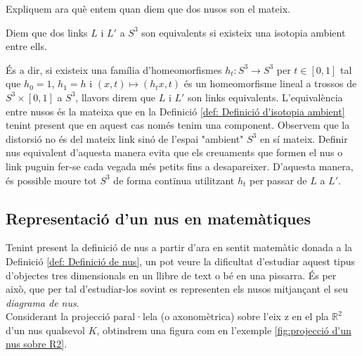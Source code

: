 Expliquem ara què entem quan diem que dos nusos son el mateix.

\begin{definition}\label{def: Definició d'isotopia ambient}
	Diem que dos links $L$ i $L'$ a $S^3$ son equivalents si existeix una isotopia ambient entre ells.
\end{definition}
És a dir, si existeix una família d'homeomorfismes $h_t:S^3\rightarrow S^3$ per $t\in[0, 1]$ tal que $h_0=1$, $h_1=h$ i $(x, t)\mapsto(h_{t}x, t)$ és un homeomorfisme lineal a trossos de $S^3\times[0, 1]$ a $S^3$, llavors direm que $L$ i $L'$ son links equivalents. L'equivalència entre nusos és la mateixa que en la Definició \ref{def: Definició d'isotopia ambient} tenint present que en aquest cas només tenim una component. Observem que la distorsió no és del mateix link sinó de l'espai "ambient" $S^3$ en sí mateix. Definir nus equivalent d'aquesta manera evita que els creuaments que formen el nus o link puguin fer-se cada vegada més petits fins a desapareixer. D'aquesta manera, és possible moure tot $S^3$ de forma contïnua utilitzant $h_t$ per passar de $L$ a $L'$.

\subsection{Representació d'un nus en matemàtiques}\label{sec:Representació de nus}
Tenint present la definició de nus a partir d'ara en sentit matemàtic donada a la Definició \ref{def: Definició de nus}, un pot veure la dificultat d'estudiar aquest tipus d'objectes tres dimensionals en un llibre de text o bé en una pissarra. És per això, que per tal d'estudiar-los sovint es representen els nusos mitjançant el seu \textit{diagrama de nus}.\\

Considerant la projecció paral·lela (o axonomètrica) sobre l'eix z en el pla $\mathbb{R}^2$ d'un nus qualsevol $K$, obtindrem una figura com en l'exemple \ref{fig:projecció d'un nus sobre R2}.

